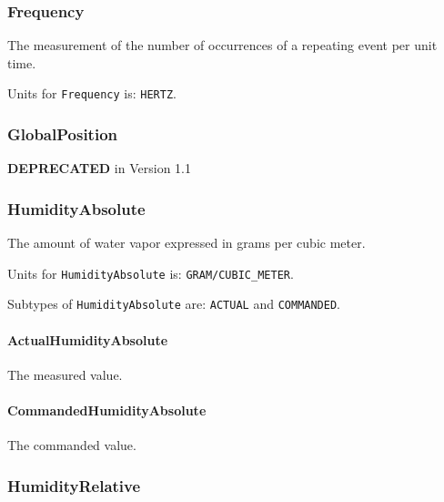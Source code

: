 \FloatBarrier

\subsubsection{Frequency}
\label{sec:Frequency}



The measurement of the number of occurrences of a repeating event per unit time.


Units for \texttt{Frequency} is: \texttt{HERTZ}.

\FloatBarrier

\subsubsection{GlobalPosition}
\label{sec:GlobalPosition}



\textbf{DEPRECATED} in Version 1.1

\FloatBarrier

\subsubsection{HumidityAbsolute}
\label{sec:HumidityAbsolute}



The amount of water vapor expressed in grams per cubic meter.


Units for \texttt{HumidityAbsolute} is: \texttt{GRAM/CUBIC_METER}.


Subtypes of \texttt{HumidityAbsolute} are: \texttt{ACTUAL} and \texttt{COMMANDED}. 
\FloatBarrier

\paragraph{ActualHumidityAbsolute}\mbox{}
\label{sec:ActualHumidityAbsolute}



The measured value.


\paragraph{CommandedHumidityAbsolute}\mbox{}
\label{sec:CommandedHumidityAbsolute}



The commanded value.


\subsubsection{HumidityRelative}
\label{sec:HumidityRelative}



